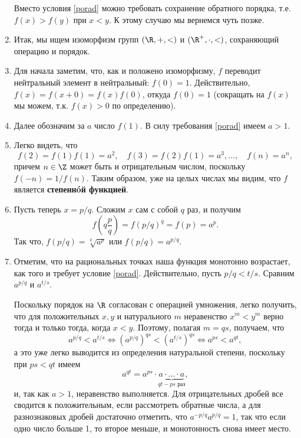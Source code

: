\begin{enumerate}
Вместо условия \eqref{porad} можно требовать сохранение обратного порядка, т.е. $f(x)>f(y)$ при $x<y$. К этому случаю мы вернемся чуть позже.

\item Итак, мы ищем изоморфизм групп $(\R,+,<)$ и $(\R^+,\cdot,<)$, сохраняющий операцию и порядок.
\item Для начала заметим, что, как и положено изоморфизму, $f$ переводит нейтральный элемент в нейтральный: $f(0)=1$. Действительно, $f(x)=f(x+0)=f(x)f(0)$, откуда $f(0)=1$ (сокращать на $f(x)$ мы можем, т.к. $f(x)>0$ по определению).
\item Далее обозначим за $a$ число $f(1)$. В силу требования \eqref{porad} имеем $a>1$.
\item Легко видеть, что
$$
f(2)=f(1)f(1)=a^2,\quad f(3)=f(2)f(1)=a^3,\dots,\quad f(n)=a^n,
$$
причем $n\in\Z$ может быть и отрицательным числом, поскольку $f(-n)=1/f(n)$. Таким образом, уже на целых числах мы видим, что $f$ является \textbf{степенн\'oй функцией}.
\item Пусть теперь $x=p/q$. Сложим $x$ сам с собой $q$ раз, и получим
$$
f\left(q\frac pq\right) = f(p/q)^q = f(p) = a^p.
$$
Так что, $f(p/q)=\sqrt[q]{a^p}$ или $f(p/q)=a^{p/q}$.

\item Отметим, что на рациональных точках наша функция монотонно возрастает, как того и требует условие \eqref{porad}. Действительно, пусть $p/q<t/s$. Сравним $a^{p/q}$ и $a^{t/s}$.

Поскольку порядок на $\R$ согласован с операцией умножения, легко получить, что для положительных $x,y$ и натурального $m$ неравенство $x^m<y^m$ верно тогда и только тогда, когда $x<y$. Поэтому, полагая $m=qs$, получаем, что
$$
a^{p/q}<a^{t/s}\Leftrightarrow (a^{p/q})^{qs}<(a^{t/s})^{qs}\Leftrightarrow a^{ps}<a^{qt},
$$
а это уже легко выводится из определения натуральной степени, поскольку при $ps<qt$ имеем
$$
a^{qt}=a^{ps}\cdot\underbrace{a\cdot\dots\cdot a}_{qt-ps\mbox{ раз}},
$$
и, так как $a>1$, неравенство выполняется. Для отрицательных дробей все сводится к положительным, если рассмотреть обратные числа, а для разнознаковых дробей достаточно отметить, что $a^{-p/q}a^{p/q}=1$, так что если одно число больше 1, то второе меньше, и монотонность снова имеет место.






\end{enumerate}
